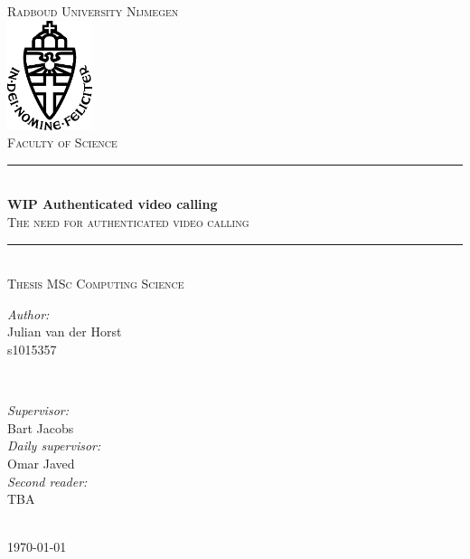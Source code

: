 \documentclass{report}
\title{\thesistitle}
\author{\thesisauthorfirst\space\thesisauthorsecond}
\date{\thesisdate}
\def\thesistitle{WIP Authenticated video calling}
\def\thesissubtitle{The need for authenticated video calling}
\def\thesisauthorfirst{Julian van der Horst \\ s1015357}
\def\thesisauthorsecond{}
\def\thesissupervisorfirst{Bart Jacobs}
\def\thesissupervisorsecond{Omar Javed}
\def\thesissecondreaderfirst{TBA}
\def\thesissecondreadersecond{}
\def\thesisdate{May 2023}
\begin{document}
    \begin{titlepage}
        \thispagestyle{empty}
        \newcommand{\HRule}{\rule{\linewidth}{0.5mm}}
        \center
        \textsc{\Large Radboud University Nijmegen}\\[.7cm]
        \includegraphics[width=25mm]{img/in_dei_nomine_feliciter.eps}\\[.5cm]
        \textsc{Faculty of Science}\\[0.5cm]

        \HRule \\[0.4cm]
        { \huge \bfseries \thesistitle}\\[0.1cm]
        \textsc{\thesissubtitle}\\
        \HRule \\[.5cm]
        \textsc{\large Thesis MSc Computing Science}\\[.5cm]

        \begin{minipage}{0.4\textwidth}
            \begin{flushleft}
                \large
                \emph{Author:}\\
                \thesisauthorfirst\space \textsc{\thesisauthorsecond}
            \end{flushleft}
        \end{minipage}
        ~
        \begin{minipage}{0.4\textwidth}
            \begin{flushright}
                \large
                \emph{Supervisor:} \\
                \thesissupervisorfirst  \\[1em]
                \emph{Daily supervisor:} \\
                \thesissupervisorsecond \\[1em]
                \emph{Second reader:} \\
                \thesissecondreaderfirst\\
            \end{flushright}
        \end{minipage}\\[4cm]
        \vfill
        {\large \today}\\
        \clearpage
    \end{titlepage}
\end{document}
